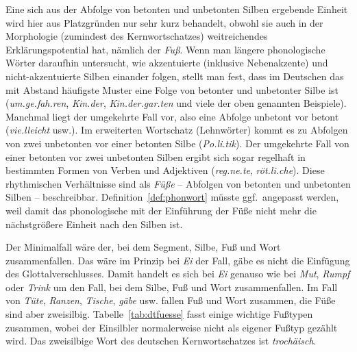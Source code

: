 \begin{exe}
  \ex\label{ex:phol9101}
  \begin{xlist}
  \end{xlist}
\end{exe}

Eine sich aus der Abfolge von betonten und unbetonten Silben ergebende Einheit wird hier aus Platzgründen nur sehr kurz behandelt, obwohl sie auch in der Morphologie (zumindest des Kernwortschatzes) weitreichendes Erklärungspotential hat, nämlich der \textit{Fuß}.
Wenn man längere phonologische Wörter daraufhin untersucht, wie akzentuierte (inklusive Nebenakzente) und nicht-akzentuierte Silben einander folgen, stellt man fest, dass im Deutschen das mit Abstand häufigste Muster eine Folge von betonter und unbetonter Silbe ist (\textit{\Akz um.ge.\Akz fah.ren}, \textit{\Akz Kin.der}, \textit{\Akz Kin.der.\Nakz gar.ten} und viele der oben genannten Beispiele).
Manchmal liegt der umgekehrte Fall vor, also eine Abfolge unbetont vor betont (\textit{vie.\Akz lleicht} usw.).
Im erweiterten Wortschatz (\idR Lehnwörter) kommt es zu Abfolgen von zwei unbetonten vor einer betonten Silbe (\textit{Po.li.\Akz tik}).
Der umgekehrte Fall von einer betonten vor zwei unbetonten Silben ergibt sich sogar regelhaft in bestimmten Formen von Verben und Adjektiven (\textit{\Akz reg.ne.te}, \textit{\Akz röt.li.che}).
Diese rhythmischen Verhältnisse sind als \textit{Füße} -- Abfolgen von betonten und unbetonten Silben -- beschreibbar.
Definition~\ref{def:phonwort} müsste ggf.\ angepasst werden, weil damit das phonologische mit der Einführung der Füße nicht mehr die nächstgrößere Einheit nach den Silben ist.


Der Minimalfall wäre der, bei dem Segment, Silbe, Fuß und Wort zusammenfallen.
Das wäre im Prinzip bei \textit{Ei} der Fall, gäbe es nicht die Einfügung des Glottalverschlusses.
Damit handelt es sich bei \textit{Ei} genauso wie bei \textit{Mut}, \textit{Rumpf} oder \textit{Trink} um den Fall, bei dem Silbe, Fuß und Wort zusammenfallen.
Im Fall von \textit{\Akz Tüte}, \textit{\Akz Ranzen}, \textit{\Akz Tische}, \textit{\Akz gäbe} usw. fallen Fuß und Wort zusammen, die Füße sind aber zweisilbig.
Tabelle~\ref{tab:dtfuesse} fasst einige wichtige Fußtypen zusammen, wobei der Einsilbler normalerweise nicht als eigener Fußtyp gezählt wird.
Das zweisilbige Wort des deutschen Kernwortschatzes ist \textit{trochäisch}.

